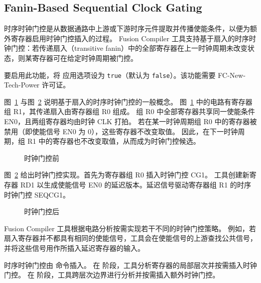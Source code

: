 \subsection*{Fanin-Based Sequential Clock Gating}

时序时钟门控是从数据通路中上游或下游时序元件提取并传播使能条件，以便为额外寄存器启用时钟门控插入的过程。
Fusion Compiler 工具支持基于扇入的时序时钟门控：若传递扇入（transitive fanin）中的全部寄存器在上一时钟周期未改变状态，则某寄存器可在给定时钟周期被门控。

要启用此功能，将  应用选项设为 \texttt{true}（默认为 \texttt{false}）。该功能需要 FC-New-Tech-Power 许可证。

图~\ref{fig:cg-seq-before} 与图~\ref{fig:cg-seq-after} 说明基于扇入的时序时钟门控的一般概念。
图~\ref{fig:cg-seq-before} 中的电路有寄存器组 R1，其传递扇入由寄存器组 R0 组成。
组 R0 中全部寄存器共享同一使能条件 EN0，且两组寄存器均由时钟 CLK 打拍。
若在某一时钟周期组 R0 中的寄存器被禁用（即使能信号 EN0 为 0），这些寄存器不改变取值。
因此，在下一时钟周期，组 R1 中的寄存器也不改变取值，从而成为时钟门控候选。

\begin{figure}[htbp]
\centering
{}
\caption{时钟门控前}
\label{fig:cg-seq-before}
\end{figure}

图~\ref{fig:cg-seq-after} 给出时钟门控实现。首先为寄存器组 R0 插入时钟门控 CG1。
工具创建新寄存器 RD1 以生成使能信号 EN0 的延迟版本。延迟信号驱动寄存器组 R1 的时序时钟门控 SEQCG1。

\begin{figure}[htbp]
\centering
{}
\caption{时钟门控后}
\label{fig:cg-seq-after}
\end{figure}

Fusion Compiler 工具根据电路分析按需实现若干不同的时钟门控策略。
例如，若扇入寄存器并不都具有相同的使能信号，工具会在使能信号的上游查找公共信号，并将这些信号用作所插入延迟寄存器的输入。

时序时钟门控由  命令插入。
在  阶段，工具分析寄存器的局部层次并按需插入时钟门控。
在  阶段，工具跨层次边界进行分析并按需插入额外时钟门控。

